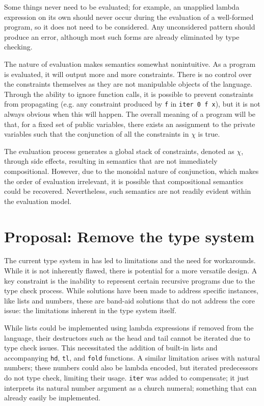 \documentclass[
    9pt,            
    techreport,       
    affiltop,       
]{art}
\begin{document}
Some things never need to be evaluated; for example, an unapplied lambda expression on its own should never occur during the evaluation of a well-formed program, so it does not need to be considered. Any unconsidered pattern should produce an error, although most such forms are already eliminated by type checking.

The nature of evaluation makes semantics somewhat nonintuitive. As a program is evaluated, it will output more and more constraints. There is no control over the constraints themselves as they are not manipulable objects of the language. Through the ability to ignore function calls, it is possible to prevent constraints from propagating (e.g. any constraint produced by \texttt{f} in \texttt{iter 0 f x}), but it is not always obvious when this will happen. The overall meaning of a program will be that, for a fixed set of public variables, there exists an assignment to the private variables such that the conjunction of all the constraints in $\chi$ is true. 

\begin{remark}
The evaluation process generates a global stack of constraints, denoted as $\chi$, through side effects, resulting in semantics that are not immediately compositional. However, due to the monoidal nature of conjunction, which makes the order of evaluation irrelevant, it is possible that compositional semantics could be recovered. Nevertheless, such semantics are not readily evident within the evaluation model.
\end{remark}

\section{Proposal: Remove the type system}
\label{sec:removal-type-system}

The current type system in \VampIR{} has led to limitations and the need for workarounds. While it is not inherently flawed, there is potential for a more versatile design. A key constraint is the inability to represent certain recursive programs due to the type check process. While solutions have been made to address specific instances, like lists and numbers, these are band-aid solutions that do not address the core issue: the limitations inherent in the type system itself. 

While lists could be implemented using lambda expressions if removed from the language, their destructors such as the head and tail cannot be iterated due to type check issues. This necessitated the addition of built-in lists and accompanying \texttt{hd}, \texttt{tl}, and \texttt{fold} functions. A similar limitation arises with natural numbers; these numbers could also be lambda encoded, but iterated predecessors do not type check, limiting their usage. \texttt{iter} was added to compensate; it just interprets its natural number argument as a church numeral; something that can already easily be implemented. 
\end{document}
